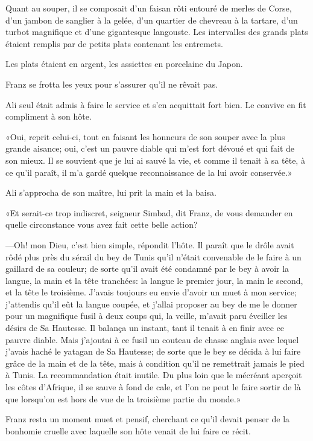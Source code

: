 Quant au souper, il se composait d'un faisan rôti entouré de merles de Corse, d'un jambon de sanglier à la gelée, d'un quartier de chevreau à la tartare, d'un turbot magnifique et d'une gigantesque langouste. Les intervalles des grands plats étaient remplis par de petits plats contenant les entremets.

Les plats étaient en argent, les assiettes en porcelaine du Japon.

Franz se frotta les yeux pour s'assurer qu'il ne rêvait pas.

Ali seul était admis à faire le service et s'en acquittait fort bien. Le convive en fit compliment à son hôte.

«Oui, reprit celui-ci, tout en faisant les honneurs de son souper avec la plus grande aisance; oui, c'est un pauvre diable qui m'est fort dévoué et qui fait de son mieux. Il se souvient que je lui ai sauvé la vie, et comme il tenait à sa tête, à ce qu'il paraît, il m'a gardé quelque reconnaissance de la lui avoir conservée.»

Ali s'approcha de son maître, lui prit la main et la baisa.

«Et serait-ce trop indiscret, seigneur Simbad, dit Franz, de vous demander en quelle circonstance vous avez fait cette belle action?

—Oh! mon Dieu, c'est bien simple, répondit l'hôte. Il paraît que le drôle avait rôdé plus près du sérail du bey de Tunis qu'il n'était convenable de le faire à un gaillard de sa couleur; de sorte qu'il avait été condamné par le bey à avoir la langue, la main et la tête tranchées: la langue le premier jour, la main le second, et la tête le troisième. J'avais toujours eu envie d'avoir un muet à mon service; j'attendis qu'il eût la langue coupée, et j'allai proposer au bey de me le donner pour un magnifique fusil à deux coups qui, la veille, m'avait paru éveiller les désirs de Sa Hautesse. Il balança un instant, tant il tenait à en finir avec ce pauvre diable. Mais j'ajoutai à ce fusil un couteau de chasse anglais avec lequel j'avais haché le yatagan de Sa Hautesse; de sorte que le bey se décida à lui faire grâce de la main et de la tête, mais à condition qu'il ne remettrait jamais le pied à Tunis. La recommandation était inutile. Du plus loin que le mécréant aperçoit les côtes d'Afrique, il se sauve à fond de cale, et l'on ne peut le faire sortir de là que lorsqu'on est hors de vue de la troisième partie du monde.»

Franz resta un moment muet et pensif, cherchant ce qu'il devait penser de la bonhomie cruelle avec laquelle son hôte venait de lui faire ce récit.

